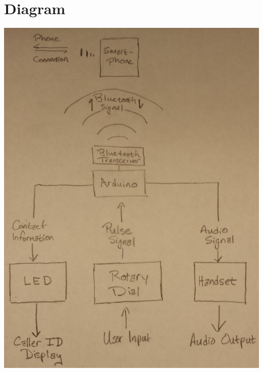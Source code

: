 \documentclass[11pt]{article}
\begin{document}
    \section{Diagram}
        \begin{center}
            \includegraphics[width=\linewidth,angle=270]{blockdiagram}
        \end{center}
\end{document}
